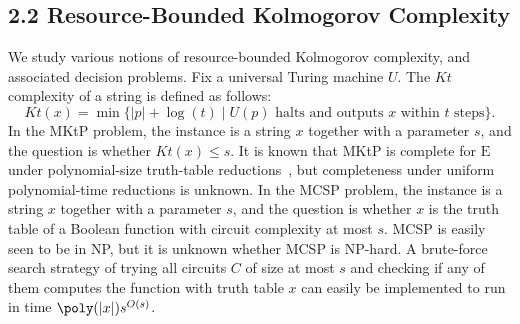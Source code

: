 \subsection*{2.2 Resource-Bounded Kolmogorov Complexity}
We study various notions of resource-bounded Kolmogorov complexity, and associated decision problems.
Fix a universal Turing machine $U$. The $Kt$ complexity of a string is defined as follows:
\[Kt(x)=\min\{|p|+\log(t)\mid U(p)\text{ halts and outputs }x\text{ within }t\text{ steps}\}.\]
In the MKtP problem, the instance is a string $x$ together with a parameter $s$, and the question is whether $Kt(x)\leq s$.
It is known that MKtP is complete for $\mathrm E$ under polynomial-size truth-table reductions~\cite{ref2}, but completeness under uniform polynomial-time reductions is unknown.
In the MCSP problem, the instance is a string $x$ together with a parameter $s$, and the question is whether $x$ is the truth table of a Boolean function with circuit complexity at most $s$.
MCSP is easily seen to be in NP, but it is unknown whether MCSP is NP-hard. A brute-force search strategy of trying all circuits $C$ of size at most $s$ and checking if any of them computes the function with truth table $x$ can easily be implemented to run in time $\poly(|x|)s^{O(s)}$.
